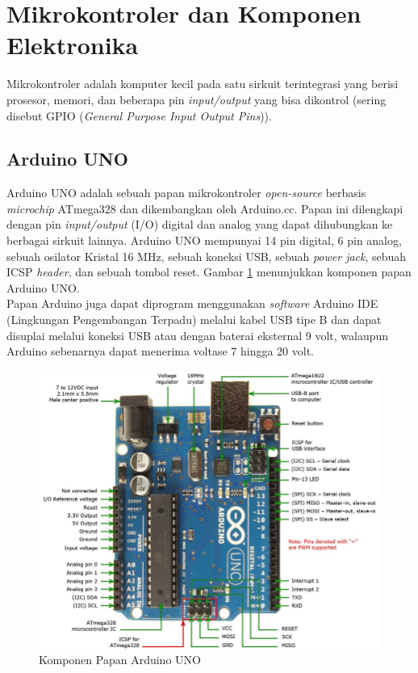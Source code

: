\section{Mikrokontroler dan Komponen Elektronika}
\tab Mikrokontroler adalah komputer kecil pada satu sirkuit terintegrasi yang berisi prosesor, memori, dan beberapa pin \textit{input/output} yang bisa dikontrol (sering disebut GPIO (\textit{General Purpose Input Output Pins})).

\subsection{Arduino UNO}
\tab Arduino UNO adalah sebuah papan mikrokontroler \textit{open-source} berbasis \textit{microchip} ATmega328 dan dikembangkan oleh Arduino.cc.\cite{arduino-uno} Papan ini dilengkapi dengan pin \textit{input/output} (I/O) digital dan analog yang dapat dihubungkan ke berbagai sirkuit lainnya. Arduino UNO mempunyai 14 pin digital, 6 pin analog, sebuah osilator Kristal 16 MHz, sebuah koneksi USB, sebuah \textit{power jack}, sebuah ICSP \textit{header}, dan sebuah tombol reset. Gambar \ref{figure:arduino-uno-pinout} menunjukkan komponen papan Arduino UNO.\\
\tab Papan Arduino juga dapat diprogram menggunakan \textit{software} Arduino IDE (Lingkungan Pengembangan Terpadu) melalui kabel USB tipe B dan dapat disuplai melalui koneksi USB atau dengan baterai eksternal 9 volt, walaupun Arduino sebenarnya dapat menerima voltase 7 hingga 20 volt.

\begin{figure}[H]
	\centerline {
		\includegraphics[width=\linewidth]{bab3/img/arduino-uno-pinout.png}
	}
	\caption{Komponen Papan Arduino UNO}
	\label{figure:arduino-uno-pinout}
\end{figure}

